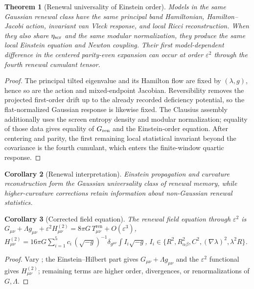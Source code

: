 \documentclass[11pt]{article}
\newtheorem{theorem}{Theorem}[section]
\newtheorem{corollary}[theorem]{Corollary}
\theoremstyle{definition}
\theoremstyle{remark}
\newcommand{\eps}{\varepsilon}
\newcommand{\Tren}{T^{\mathrm{ren}}}
\begin{document}
\begin{theorem}[Renewal universality of Einstein order]
\label{thm:renewal-universality}
Models in the same Gaussian renewal class have the same principal band
Hamiltonian, Hamilton--Jacobi action, invariant van Vleck response, and local
Ricci reconstruction.  When they also share $\eta_{\rm scr}$ and the same modular
normalization, they produce the same local Einstein equation and Newton coupling.
Their first model-dependent difference in the centered parity-even expansion can
occur at order $\eps^2$ through the fourth renewal cumulant tensor.
\end{theorem}

\begin{proof}
The principal tilted eigenvalue and its Hamilton flow are fixed by
$(\lambda,g)$, hence so are the action and mixed-endpoint Jacobian.  Reversibility
removes the projected first-order drift up to the already recorded deficiency
potential, so the flat-normalized Gaussian response is likewise fixed.  The
Clausius assembly additionally uses the screen entropy density and modular
normalization; equality of those data gives equality of $G_{\rm ren}$ and the
Einstein-order equation.  After centering and parity, the first remaining local
statistical invariant beyond the covariance is the fourth cumulant, which enters
the finite-window quartic response.
\end{proof}

\begin{corollary}[Renewal interpretation]
\label{cor:renewal-universality-slogan}
Einstein propagation and curvature reconstruction form the Gaussian universality
class of renewal memory, while higher-curvature corrections retain information
about non-Gaussian renewal statistics.
\end{corollary}

\begin{corollary}[Corrected field equation]
\label{cor:corrected-field-equation}
The renewal field equation through $\eps^2$ is
$G_{\mu\nu}+\Lambda g_{\mu\nu}+\eps^2H^{(2)}_{\mu\nu}=8\pi G\,\Tren_{\mu\nu}+O(\eps^3)$,
$H^{(2)}_{\mu\nu}=16\pi G\sum_{i=1}^5 c_i\,(\sqrt{-g})^{-1}\delta_{g^{\mu\nu}}\!\int I_i\sqrt{-g}$,
$I_i\in\{R^2,R_{\alpha\beta}^2,C^2,(\nabla\lambda)^2,\lambda^2R\}$.
\end{corollary}

\begin{proof}
Vary ; the Einstein--Hilbert part gives
$G_{\mu\nu}+\Lambda g_{\mu\nu}$ and the $\eps^2$ functional gives $H^{(2)}_{\mu\nu}$;
remaining terms are higher order, divergences, or renormalizations of $G,\Lambda$.
\end{proof}
\end{document}
